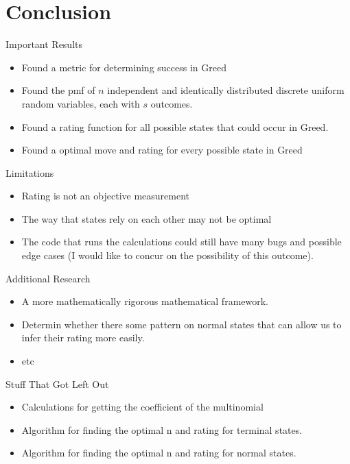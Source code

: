 \documentclass{beamer}
\begin{document}
\section{Conclusion}

\begin{frame}{Important Results}
    \begin{itemize}{}
        \item Found a metric for determining success in Greed
        \item Found the pmf of $n$ independent and identically distributed discrete uniform random variables, each with $s$ outcomes.
        \item Found a rating function for all possible states that could occur in Greed.
        \item Found a optimal move and rating for every possible state in Greed
    \end{itemize}
\end{frame}

\begin{frame}{Limitations}
    \begin{itemize}{}
        \item Rating is not an objective measurement
        \item The way that states rely on each other may not be optimal
        \item The code that runs the calculations could still have many bugs and possible edge cases (I would like to concur on the possibility of this outcome).
    \end{itemize}
\end{frame}

\begin{frame}{Additional Research}
    \begin{itemize}{}
        \item A more mathematically rigorous mathematical framework.
        \item Determin whether there some pattern on normal states that can allow us to infer their rating more easily.
        \item etc
    \end{itemize}
\end{frame}

\begin{frame}{Stuff That Got Left Out}
    \begin{itemize}{}
        \item Calculations for getting the coefficient of the multinomial
        \item Algorithm for finding the optimal n and rating for terminal states.
        \item Algorithm for finding the optimal n and rating for normal states.
    \end{itemize}
\end{frame}
\end{document}
